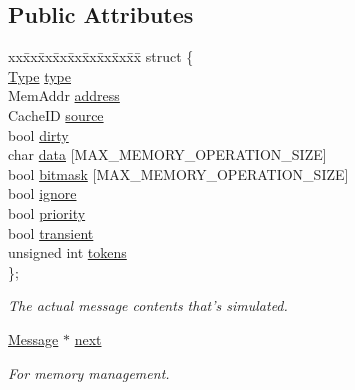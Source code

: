 \subsection*{Public Attributes}
\begin{DoxyCompactItemize}
\item 
\begin{tabbing}
xx\=xx\=xx\=xx\=xx\=xx\=xx\=xx\=xx\=\kill
struct \{\\
\>\hyperlink{union_simulator_1_1_z_l_c_d_m_a_1_1_node_1_1_message_af07062ac08bff2800b7ca0ad29c28d0c}{Type} \hyperlink{union_simulator_1_1_z_l_c_d_m_a_1_1_node_1_1_message_adef32143d77295adc3b9535824a7f191}{type}\\
\>MemAddr \hyperlink{union_simulator_1_1_z_l_c_d_m_a_1_1_node_1_1_message_adfc4422a6f52726838e053b39e018df3}{address}\\
\>CacheID \hyperlink{union_simulator_1_1_z_l_c_d_m_a_1_1_node_1_1_message_a8085ca2bc6a7d902afbff4c6f3d87b6c}{source}\\
\>bool \hyperlink{union_simulator_1_1_z_l_c_d_m_a_1_1_node_1_1_message_a108a14da3dd8726d51b3acb7dc592c24}{dirty}\\
\>char \hyperlink{union_simulator_1_1_z_l_c_d_m_a_1_1_node_1_1_message_acdd7a766ae253d09744b16afa0b8669f}{data} \mbox{[}MAX\_MEMORY\_OPERATION\_SIZE\mbox{]}\\
\>bool \hyperlink{union_simulator_1_1_z_l_c_d_m_a_1_1_node_1_1_message_a38b5400b392d9cb21247af66c22293af}{bitmask} \mbox{[}MAX\_MEMORY\_OPERATION\_SIZE\mbox{]}\\
\>bool \hyperlink{union_simulator_1_1_z_l_c_d_m_a_1_1_node_1_1_message_ae19c02031a158dbee24458b81325d797}{ignore}\\
\>bool \hyperlink{union_simulator_1_1_z_l_c_d_m_a_1_1_node_1_1_message_ae66cb95e6b63177dfbf686c839e24600}{priority}\\
\>bool \hyperlink{union_simulator_1_1_z_l_c_d_m_a_1_1_node_1_1_message_a50e894399ec5f2cf9ccbe8583c450679}{transient}\\
\>unsigned int \hyperlink{union_simulator_1_1_z_l_c_d_m_a_1_1_node_1_1_message_a72fb5d85b222e5f0d7200ce873d7d5aa}{tokens}\\
\}; \\

\end{tabbing}\begin{DoxyCompactList}\small\item\em The actual message contents that's simulated. \end{DoxyCompactList}\item 
\hyperlink{union_simulator_1_1_z_l_c_d_m_a_1_1_node_1_1_message}{Message} $\ast$ \hyperlink{union_simulator_1_1_z_l_c_d_m_a_1_1_node_1_1_message_a2fd84730ff7885eaa47f84ac49978ac8}{next}
\begin{DoxyCompactList}\small\item\em For memory management. \end{DoxyCompactList}\end{DoxyCompactItemize}


